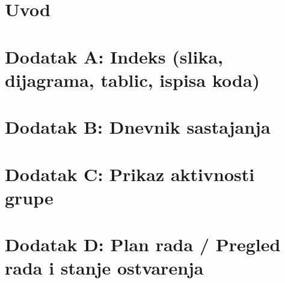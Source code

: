 \documentclass[a4paper, 12pt]{article}
\begin{document}
\thispagestyle{fancy}
	

	\addtocounter{page}{1}

	\newpage
	\tableofcontents
	
	\newpage
	\section{Uvod}
	

	\newpage
	
	
	

	\newpage
	\begin{appendices}
		\section{Dodatak A: Indeks (slika, dijagrama, tablic, ispisa koda)}
			\renewcommand\listfigurename{}
			\listoffigures
		
		\newpage
		\section{Dodatak B: Dnevnik sastajanja}

		\newpage
		\section{Dodatak C: Prikaz aktivnosti grupe}

		\newpage
		\section{Dodatak D: Plan rada / Pregled rada i stanje ostvarenja}
	\end{appendices}
	
\end{document}
